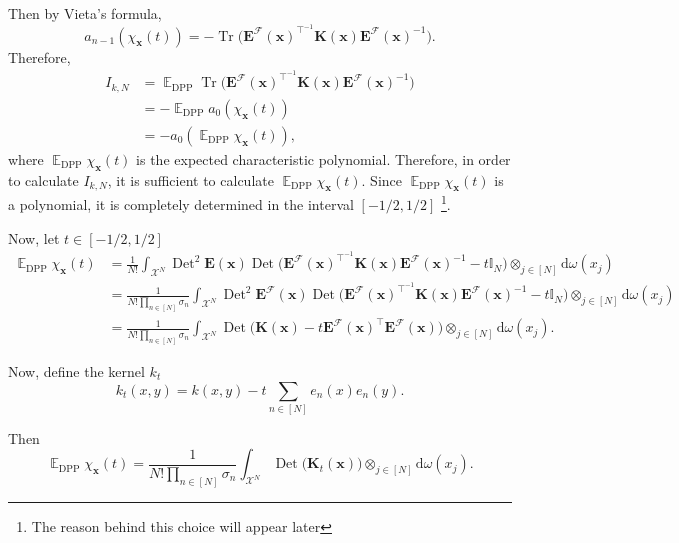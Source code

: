 \documentclass[twoside,11pt]{book}
\numberwithin{theorem}{chapter}
\numberwithin{definition}{chapter}
\numberwithin{proposition}{chapter}
\numberwithin{corollary}{chapter}
\numberwithin{example}{chapter}
\numberwithin{lemma}{chapter}
\numberwithin{assumption}{chapter}
\DeclareMathOperator{\Tr}{Tr}
\DeclareMathOperator{\Det}{Det}
\DeclareMathOperator{\DPP}{\mathrm{DPP}}
\DeclareMathOperator{\Tran}{\intercal}
\DeclareMathOperator{\EX}{\mathbb{E}}
\begin{document}
Then by Vieta's formula, 
\begin{equation}
a_{n-1}(\chi_{\bm{x}}(t)) = -\Tr \Big(\bm{E}^{\mathcal{F}}(\bm{x})^{\Tran^{-1}}\bm{K}(\bm{x})\bm{E}^{\mathcal{F}}(\bm{x})^{-1} \Big).
\end{equation}
Therefore,
\begin{align}
I_{k,N}  & = \EX_{\DPP} \Tr \Big(\bm{E}^{\mathcal{F}}(\bm{x})^{\Tran^{-1}}\bm{K}(\bm{x})\bm{E}^{\mathcal{F}}(\bm{x})^{-1} \Big) \nonumber\\
& = -\EX_{\DPP} a_{0}(\chi_{\bm{x}}(t)) \nonumber\\
& = -a_{0}(\EX_{\DPP} \chi_{\bm{x}}(t)),
\end{align}
where $\EX_{\DPP} \chi_{\bm{x}}(t)$ is the expected characteristic polynomial. Therefore, in order to calculate $I_{k,N}$, it is sufficient to calculate $\EX_{\DPP} \chi_{\bm{x}}(t)$. Since $\EX_{\DPP} \chi_{\bm{x}}(t)$ is a polynomial, it is completely determined in the interval $[-1/2,1/2]$ \footnote{The reason behind this choice will appear later}.  

Now, let $t \in [-1/2,1/2]$
\begin{align}\label{eq:EX_chi_x}
 \EX_{\DPP} \chi_{\bm{x}}(t) & = \frac{1}{N!} \int_{\mathcal{X}^{N}} \Det^{2}\bm{E}(\bm{x}) \Det \Big( \bm{E}^{\mathcal{F}}(\bm{x})^{\Tran^{-1}}\bm{K}(\bm{x})\bm{E}^{\mathcal{F}}(\bm{x})^{-1}  - t \mathbb{I}_{N} \Big) \otimes_{j \in [N]} \mathrm{d}\omega(x_{j}) \nonumber\\
& = \frac{1}{N!\prod\limits_{n \in [N]}\sigma_{n}} \int_{\mathcal{X}^{N}} \Det^{2}\bm{E}^{\mathcal{F}}(\bm{x}) \Det \Big( \bm{E}^{\mathcal{F}}(\bm{x})^{\Tran^{-1}}\bm{K}(\bm{x})\bm{E}^{\mathcal{F}}(\bm{x})^{-1}  - t \mathbb{I}_{N} \Big) \otimes_{j \in [N]} \mathrm{d}\omega(x_{j}) \nonumber\\
& = \frac{1}{N!\prod\limits_{n \in [N]}\sigma_{n}} \int_{\mathcal{X}^{N}} \Det \Big( \bm{K}(\bm{x})  - t \bm{E}^{\mathcal{F}}(\bm{x})^{\Tran} \bm{E}^{\mathcal{F}}(\bm{x}) \Big) \otimes_{j \in [N]} \mathrm{d}\omega(x_{j}).
\end{align}

Now, define the kernel $k_{t}$ 
\begin{equation}
k_{t}(x,y) = k(x,y) - t\sum\limits_{n \in [N]}e_{n}(x)e_{n}(y).
\end{equation}

Then
\begin{equation}
\EX_{\DPP} \chi_{\bm{x}}(t) = \frac{1}{N!\prod\limits_{n \in [N]}\sigma_{n}} \int_{\mathcal{X}^{N}} \Det \big( \bm{K}_{t}(\bm{x}) \big) \otimes_{j \in [N]} \mathrm{d}\omega(x_{j}).
\end{equation}
\end{document}

